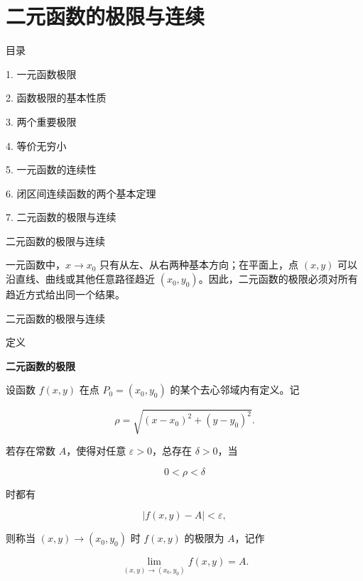\documentclass[aspectratio=169,10pt,fontset=fandol]{ctexbeamer}
\begin{document}
\section{二元函数的极限与连续}
\begin{frame}[t,fragile]{目录}
\normalsize
{\color{black}\normalsize 1. 一元函数极限\par}\vspace{0.22em}
{\color{black}\normalsize 2. 函数极限的基本性质\par}\vspace{0.22em}
{\color{black}\normalsize 3. 两个重要极限\par}\vspace{0.22em}
{\color{black}\normalsize 4. 等价无穷小\par}\vspace{0.22em}
{\color{black}\normalsize 5. 一元函数的连续性\par}\vspace{0.22em}
{\color{black}\normalsize 6. 闭区间连续函数的两个基本定理\par}\vspace{0.22em}
{\color{blue}\normalsize 7. 二元函数的极限与连续\par}\vspace{0.22em}
\end{frame}
\begin{frame}[t,fragile]{二元函数的极限与连续}
\normalsize
{\normalsize
一元函数中，\(x\to x_0\) 只有从左、从右两种基本方向；在平面上，点 \((x,y)\) 可以沿直线、曲线或其他任意路径趋近 \((x_0,y_0)\)。因此，二元函数的极限必须对所有趋近方式给出同一个结果。




}
\end{frame}
\begin{frame}[t,fragile]{二元函数的极限与连续}
\footnotesize
\begin{block}{定义}
{\footnotesize
\textbf{二元函数的极限}\par


	设函数 \(f(x,y)\) 在点 \(P_0=(x_0,y_0)\) 的某个去心邻域内有定义。记

	\[

	\rho=\sqrt{(x-x_0)^2+(y-y_0)^2}.

	\]

	若存在常数 \(A\)，使得对任意 \(\varepsilon>0\)，总存在 \(\delta>0\)，当

	\[

	0<\rho<\delta

	\]

	时都有

	\[

	|f(x,y)-A|<\varepsilon,

	\]

	则称当 \((x,y)\to(x_0,y_0)\) 时 \(f(x,y)\) 的极限为 \(A\)，记作

	\[

	\lim_{(x,y)\to(x_0,y_0)}f(x,y)=A.

	\]


}
\end{block}
\end{frame}
\end{document}
